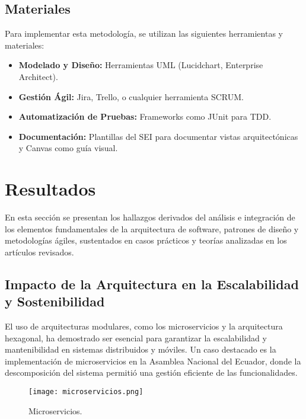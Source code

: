 \documentclass[conference]{IEEEtran}
\begin{document}
\subsection{Materiales}

Para implementar esta metodología, se utilizan las siguientes herramientas y materiales:
\begin{itemize}
    \item \textbf{Modelado y Diseño:} Herramientas UML (Lucidchart, Enterprise Architect).
    \item \textbf{Gestión Ágil:} Jira, Trello, o cualquier herramienta SCRUM.
    \item \textbf{Automatización de Pruebas:} Frameworks como JUnit para TDD.
    \item \textbf{Documentación:} Plantillas del SEI para documentar vistas arquitectónicas y Canvas como guía visual.\\
\end{itemize}

\section{Resultados}

En esta sección se presentan los hallazgos derivados del análisis e integración de los elementos fundamentales de la arquitectura de software, patrones de diseño y metodologías ágiles, sustentados en casos prácticos y teorías analizadas en los artículos revisados.

\subsection{Impacto de la Arquitectura en la Escalabilidad y Sostenibilidad}

El uso de arquitecturas modulares, como los microservicios y la arquitectura hexagonal, ha demostrado ser esencial para garantizar la escalabilidad y mantenibilidad en sistemas distribuidos y móviles. Un caso destacado es la implementación de microservicios en la Asamblea Nacional del Ecuador, donde la descomposición del sistema permitió una gestión eficiente de las funcionalidades.

\begin{figure}[H] %
    \centering
    \texttt{[image: microservicios.png]} %
    \caption{Microservicios.}
    \label{fig:etiqueta-imagen} %
\end{figure}
\end{document}
